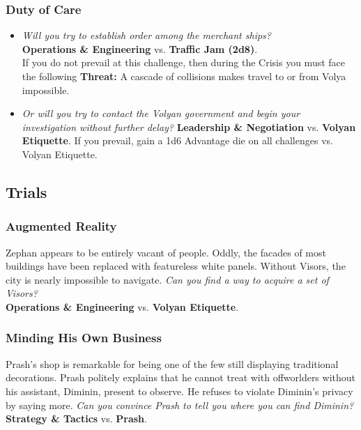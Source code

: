 \documentclass[11pt, a5paper, parskip=half-, DIV=12]{scrartcl}
\begin{document}
\subsubsection*{Duty of Care}
\begin{itemize}
	\item \textit{Will you try to establish order among the merchant ships?} \\ \textbf{Operations \& Engineering} vs. \textbf{Traffic Jam (2d8)}. \\ If you do not prevail at this challenge, then during the Crisis you must face the following \textbf{Threat:} A cascade of collisions makes travel to or from Volya impossible.  
	\item \textit{Or will you try to contact the Volyan government and begin your investigation without further delay?} \textbf{Leadership \& Negotiation} vs. \textbf{Volyan Etiquette}. If you prevail, gain a 1d6 Advantage die on all challenges vs. Volyan Etiquette.
\end{itemize}

\newpage

\subsection*{Trials}
\subsubsection*{Augmented Reality}
Zephan appears to be entirely vacant of people. Oddly, the facades of most buildings have been replaced with featureless white panels.
Without Visors, the city is nearly impossible to navigate. \textit{Can you find a way to acquire a set of Visors?} \\ \textbf{Operations \& Engineering} vs. \textbf{Volyan Etiquette}.

\subsubsection*{Minding His Own Business}
Prash's shop is remarkable for being one of the few still displaying traditional decorations. Prash politely explains that he cannot treat with offworlders without his assistant, Diminin, present to observe.
He refuses to violate Diminin's privacy by saying more.
\textit{Can you convince Prash to tell you where you can find Diminin?} \textbf{Strategy \& Tactics} vs. \textbf{Prash}.
\end{document}
